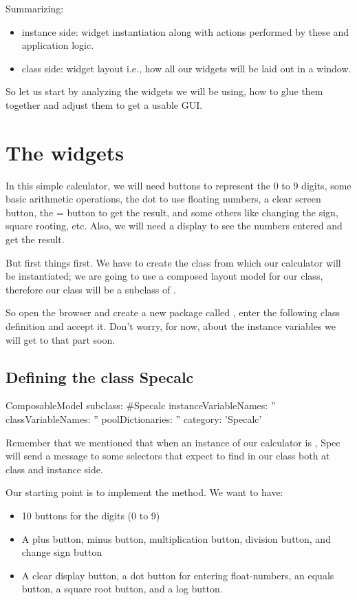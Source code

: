 \documentclass[a4paper,10pt,twoside]{book}
\begin{document}
Summarizing:

\begin{itemize}
\item  instance side: widget instantiation along with actions performed by these and application logic.
\item  class side: widget layout i.e., how all our widgets will be laid out in a window.
\end{itemize}

So let us start by analyzing the widgets we will be using, how to glue them together and adjust them to get a usable GUI.
\section{ The widgets}
In this simple calculator, we will need buttons to represent the 0 to 9 digits, some basic arithmetic operations, the dot to use floating numbers, a clear screen button, the = button to get the result, and some others like changing the sign, square rooting, etc. Also, we will need a display to see the numbers entered and get the result. 

But first things first. We have to create the class from which our calculator will be instantiated; we are going to use a composed layout model for our class, therefore our class will be a subclass of .

So open the browser and create a new package called , enter the following class definition and accept it. Don't worry, for now, about the instance variables we will get to that part soon.
\subsection{ Defining the class Specalc}

\begin{code}{}
ComposableModel subclass: #Specalc
	instanceVariableNames: ''
	classVariableNames: ''
	poolDictionaries: ''
	category: 'Specalc'
\end{code}


Remember that we mentioned that when an instance of our calculator is , Spec will send a message to some selectors that expect to find in our class both at class and instance side.

Our starting point is to implement the  method.
We want to have:

\begin{itemize}
\item  10 buttons for the digits (0 to 9)
\item  A plus button, minus button, multiplication button, division button, and change sign button 
\item  A clear display button, a dot button for entering float-numbers, an equals button, a square root button, and a log button. 
\end{itemize}
\end{document}
